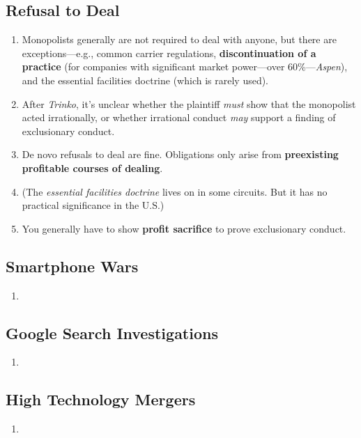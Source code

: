 \subsection{Refusal to Deal}

\begin{enumerate}
    \item Monopolists generally are not required to deal with anyone, but 
    there are exceptions---e.g., common carrier regulations, 
    \textbf{discontinuation of a practice} (for companies with significant 
    market power---over 60\%---\emph{Aspen}), and the essential facilities 
    doctrine (which is rarely used).
    \item After \emph{Trinko}, it's unclear whether the plaintiff \emph{must} 
    show that the monopolist acted irrationally, or whether irrational conduct 
    \emph{may} support a finding of exclusionary conduct.
    \item De novo refusals to deal are fine. Obligations only arise from 
    \textbf{preexisting profitable courses of dealing}.
    \item (The \emph{essential facilities doctrine} lives on in some circuits. 
    But it has no practical significance in the U.S.)
    \item You generally have to show \textbf{profit sacrifice} to prove 
    exclusionary conduct.
\end{enumerate}

\subsection{Smartphone Wars} %

\begin{enumerate}
    \item 
\end{enumerate}

\subsection{Google Search Investigations} %

\begin{enumerate}
    \item 
\end{enumerate}

\subsection{High Technology Mergers} %

\begin{enumerate}
    \item 
\end{enumerate}
